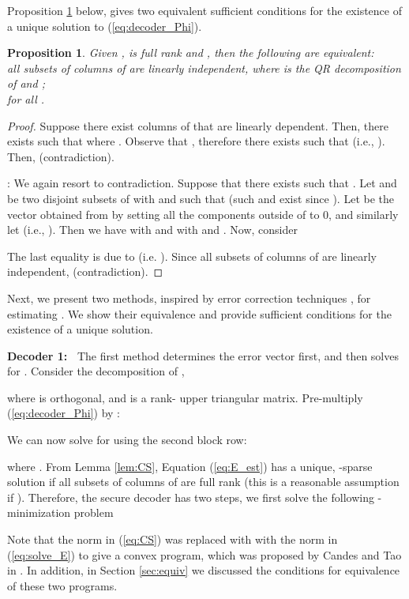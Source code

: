 \documentclass[journal]{IEEEtran}
\newtheorem{prop}{\bf{Proposition}}
\begin{document}
Proposition \ref{prop:equivalent} below, gives two equivalent sufficient conditions for the existence of a unique solution  to (\ref{eq:decoder_Phi}).

\begin{prop} \label{prop:equivalent}
Given ,  is full rank and , then the following are equivalent: \\ all subsets of  columns of  are linearly independent, where   is the QR decomposition of  and ;\\
  for all .
\end{prop}
\begin{proof}
 Suppose there exist  columns of  that are linearly dependent. Then, there exists  such that  where . Observe that , therefore there exists  such that  (i.e., ). Then,  (contradiction).

: We again resort to contradiction. Suppose that there exists  such that . Let  and  be two disjoint subsets of  with  and  such that  (such  and  exist since ). Let  be the vector obtained from  by setting all the components outside of  to 0, and similarly let  (i.e., ). Then we have  with  and  with  and . Now, consider 

The last equality is due to  (i.e. ). Since all subsets of  columns of  are linearly independent,  (contradiction).
\end{proof}


Next, we present two methods, inspired by error correction techniques \cite{Candes_Tao}\cite{David_Chang}, for estimating . We show their equivalence and provide sufficient conditions for the existence of a unique solution.

\noindent
{\bf Decoder 1:~} The first method determines the error vector  first, and then solves for . Consider the  decomposition of ,

where  is orthogonal,  and  is a rank- upper triangular matrix. Pre-multiply (\ref{eq:decoder_Phi}) by :

We can now solve for  using the second block row:

where . From Lemma \ref{lem:CS}, Equation (\ref{eq:E_est}) has a unique, -sparse solution if all subsets of  columns of  are full rank (this is a reasonable assumption if ). 
Therefore, the secure decoder has two steps, we first solve the following -minimization problem

Note that the  norm in (\ref{eq:CS}) was replaced with with the  norm in (\ref{eq:solve_E}) to give a convex program, which was proposed by Candes and Tao in \cite{Candes_Tao}. In addition, in Section \ref{sec:equiv} we discussed the conditions for equivalence of these two programs.
\end{document}
